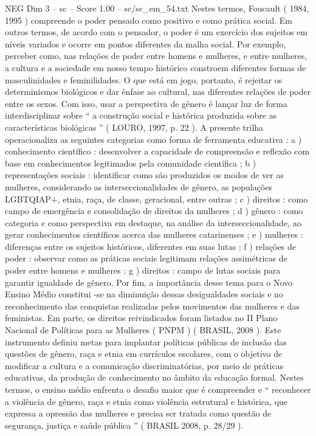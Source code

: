 \begin{textsample}{NEG Dim 3 – sc – Score 1.00 – sc/sc\_em\_54.txt}
Nestes termos, Foucault ( 1984, 1995 ) compreende o poder pensado como positivo e como prática social.
Em outros termos, de acordo com o pensador, o poder é um exercício dos sujeitos em níveis variados e ocorre em pontos diferentes da malha social.
Por exemplo, perceber como, nas relações de poder entre homens e mulheres, e entre mulheres, a cultura e a sociedade em nosso tempo histórico constroem diferentes formas de masculinidades e feminilidades.
O que está em jogo, portanto, é rejeitar os determinismos biológicos e dar ênfase ao cultural, nas diferentes relações de poder entre os sexos.
Com isso, usar a perspectiva de gênero é lançar luz de forma interdisciplinar sobre “ a construção social e histórica produzida sobre as características biológicas ” ( LOURO, 1997, p. 22 ).
A presente trilha operacionaliza as seguintes categorias como forma de ferramenta educativa : a ) conhecimento científico : desenvolver a capacidade de compreensão e reflexão com base em conhecimentos legitimados pela comunidade científica ; b ) representações sociais : identificar como são produzidos os modos de ver as mulheres, considerando as interseccionalidades de gênero, as populações LGBTQIAP+, etnia, raça, de classe, geracional, entre outras ; c ) direitos : como campo de emergência e consolidação de direitos da mulheres ; d ) gênero : como categoria e como perspectiva em destaque, na análise da interseccionalidade, ao gerar conhecimentos científicos acerca das mulheres catarinenses ; e ) mulheres : diferenças entre os sujeitos históricos, diferentes em suas lutas ; f ) relações de poder : observar como as práticas sociais legitimam relações assimétricas de poder entre homens e mulheres ; g ) direitos : campo de lutas sociais para garantir igualdade de gênero.
Por fim, a importância desse tema para o Novo Ensino Médio constitui -se na diminuição dessas desigualdades sociais e no reconhecimento das conquistas realizadas pelos movimentos das mulheres e das feministas.
Em parte, os direitos reivindicados foram listados no II Plano Nacional de Políticas para as Mulheres ( PNPM ) ( BRASIL, 2008 ).
Este instrumento definiu metas para implantar políticas públicas de inclusão das questões de gênero, raça e etnia em currículos escolares, com o objetivo de modificar a cultura e a comunicação discriminatórias, por meio de práticas educativas, da produção de conhecimento no âmbito da educação formal.
Nestes termos, o ensino médio enfrenta o desafio maior que é compreender e “ reconhecer a violência de gênero, raça e etnia como violência estrutural e histórica, que expressa a opressão das mulheres e precisa ser tratada como questão de segurança, justiça e saúde pública ” ( BRASIL 2008, p. 28/29 ).

\end{textsample}
